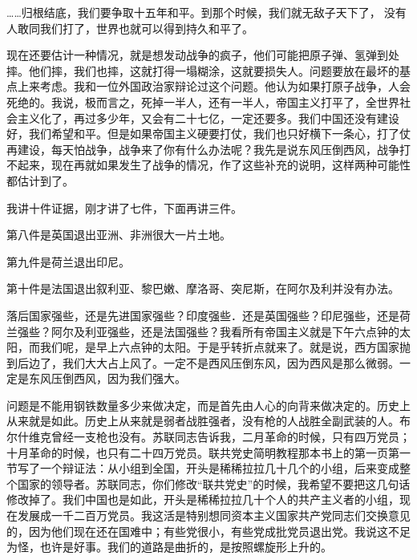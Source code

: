 ……归根结底，我们要争取十五年和平。到那个时候，我们就无敌子天下了，没有人敢同我们打了，世界也就可以得到持久和平了。

现在还要估计一种情况，就是想发动战争的疯子，他们可能把原子弹、氢弹到处摔。他们摔，我们也摔，这就打得一塌糊涂，这就要损失人。问题要放在最坏的基点上来考虑。我和一位外国政治家辩论过这个问题。他认为如果打原子战争，人会死绝的。我说，极而言之，死掉一半人，还有一半人，帝国主义打平了，全世界社会主义化了，再过多少年，又会有二十七亿，一定还要多。我们中国还没有建设好，我们希望和平。但是如果帝国主义硬要打仗，我们也只好横下一条心，打了仗再建设，每天怕战争，战争来了你有什么办法呢？我先是说东风压倒西风，战争打不起来，现在再就如果发生了战争的情况，作了这些补充的说明，这样两种可能性都估计到了。

我讲十件证据，刚才讲了七件，下面再讲三件。

第八件是英国退出亚洲、非洲很大一片土地。

第九件是荷兰退出印尼。

第十件是法国退出叙利亚、黎巴嫩、摩洛哥、突尼斯，在阿尔及利并没有办法。

落后国家强些，还是先进国家强些？印度强些．还是英国强些？印尼强些，还是荷兰强些？阿尔及利亚强些，还是法国强些？我看所有帝国主义就是下午六点钟的太阳，而我们呢，是早上六点钟的太阳。于是乎转折点就来了。就是说，西方国家抛到后边了，我们大大占上风了。一定不是西风压倒东风，因为西风是那么微弱。一定是东风压倒西风，因为我们强大。

问题是不能用钢铁数量多少来做决定，而是首先由人心的向背来做决定的。历史上从来就是如此。历史上从来就是弱者战胜强者，没有枪的人战胜全副武装的人。布尔什维克曾经一支枪也没有。苏联同志告诉我，二月革命的时候，只有四万党员；十月革命的时候，也只有二十四万党员。联共党史简明教程那本书上的第一页第一节写了一个辩证法：从小组到全国，开头是稀稀拉拉几十几个的小组，后来变成整个国家的领导者。苏联同志，你们修改“联共党史”的时候，我希望不要把这几句话修改掉了。我们中国也是如此，开头是稀稀拉拉几十个人的共产主义者的小组，现在发展成一千二百万党员。我这活是特别想同资本主义国家共产党同志们交换意见的，因为他们现在还在国难中；有些党很小，有些党成批党员退出党。我说这不足为怪，也许是好事。我们的道路是曲折的，是按照螺旋形上升的。

